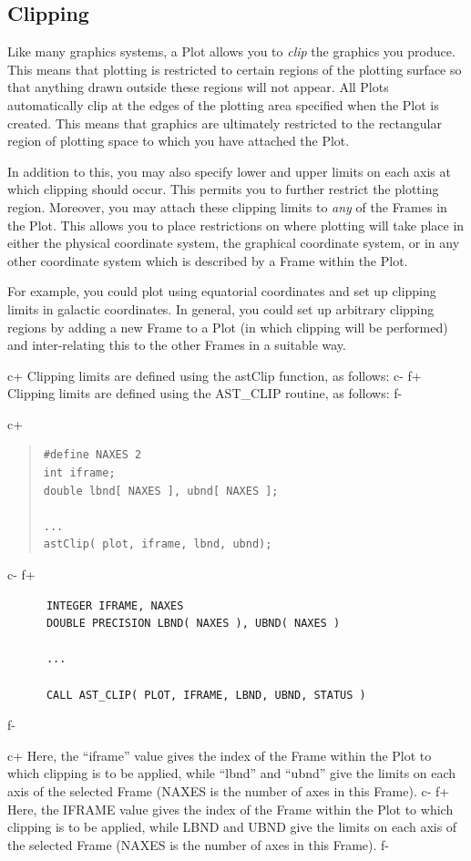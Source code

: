 \documentclass[twoside,11pt]{article}
\begin{document}
\subsection{\label{ss:clipping}Clipping}

Like many graphics systems, a Plot allows you to {\em{clip}} the graphics
you produce. This means that plotting is restricted to certain regions
of the plotting surface so that anything drawn outside these regions
will not appear.  All Plots automatically clip at the edges of the
plotting area specified when the Plot is created. This means that
graphics are ultimately restricted to the rectangular region of
plotting space to which you have attached the Plot.

In addition to this, you may also specify lower and upper limits on
each axis at which clipping should occur. This permits you to further
restrict the plotting region. Moreover, you may attach these clipping
limits to {\em{any}} of the Frames in the Plot. This allows you to
place restrictions on where plotting will take place in either the
physical coordinate system, the graphical coordinate system, or in any
other coordinate system which is described by a Frame within the Plot.

For example, you could plot using equatorial coordinates and set up
clipping limits in galactic coordinates. In general, you could set up
arbitrary clipping regions by adding a new Frame to a Plot (in which
clipping will be performed) and inter-relating this to the other
Frames in a suitable way.

c+
Clipping limits are defined using the astClip function, as follows:
c-
f+
Clipping limits are defined using the AST\_CLIP routine, as follows:
f-

c+
\begin{quote}
\small
\begin{verbatim}
#define NAXES 2
int iframe;
double lbnd[ NAXES ], ubnd[ NAXES ];

...
astClip( plot, iframe, lbnd, ubnd);
\end{verbatim}
\normalsize
\end{quote}
c-
f+
\small
\begin{verbatim}
      INTEGER IFRAME, NAXES
      DOUBLE PRECISION LBND( NAXES ), UBND( NAXES )

      ...

      CALL AST_CLIP( PLOT, IFRAME, LBND, UBND, STATUS )
\end{verbatim}
\normalsize
f-

c+
Here, the ``iframe'' value gives the index of the Frame within the
Plot to which clipping is to be applied, while ``lbnd'' and ``ubnd''
give the limits on each axis of the selected Frame (NAXES is the
number of axes in this Frame).
c-
f+
Here, the IFRAME value gives the index of the Frame within the Plot to
which clipping is to be applied, while LBND and UBND give the limits
on each axis of the selected Frame (NAXES is the number of axes in
this Frame).
f-
\end{document}
